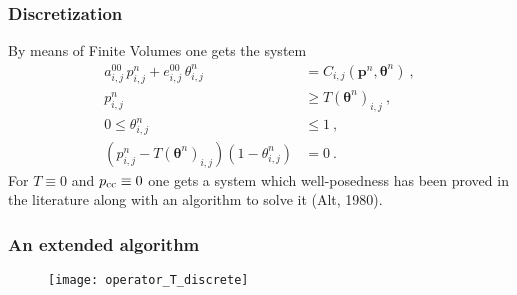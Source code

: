 \documentclass[10pt,aspectratio=169]{beamer}
\begin{document}
\begin{frame}
\frametitle{Discretization}
By means of Finite Volumes one gets the system
\begin{align*}
a^{00}_{i,j}\,p^n_{i,j}+e^{00}_{i,j}\,\theta^n_{i,j} &= C_{i,j}(\bm{p}^n,\bm{\theta}^n)~,\\
p_{i,j}^n&\geq T\left(\bm{\theta}^n\right)_{i,j}~,\\
0\leq \theta_{i,j}^n&\leq 1~,\\
\left(p_{i,j}^n-T\left(\bm{\theta}^n\right)_{i,j}\right)\left(1-\theta_{i,j}^n\right)&=0~.
\end{align*}
For $T\equiv 0$ and $p_{\textnormal{\scriptsize{cc}}}\equiv 0$ one gets a system which well-posedness has been proved in the literature along with an algorithm to solve it (Alt, 1980). 
\end{frame}

\begin{frame}\frametitle{An extended algorithm}\vspace*{0.7cm}\hspace*{-0.5cm}
	\begin{minipage}[c]{0.6\linewidth}\footnotesize 
		\begin{algorithm}[H]

		\end{algorithm}
	\end{minipage}
	\begin{minipage}{0.35\linewidth}
		 \begin{figure}
		 	\centering
		 	\texttt{[image: operator\_T\_discrete]}
		 \end{figure}
\end{minipage}
\end{frame}
\end{document}
